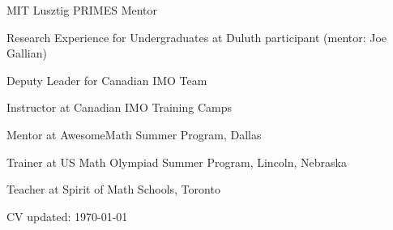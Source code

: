 \documentclass[11pt]{amsart}
\begin{document}

MIT Lusztig PRIMES Mentor

Research Experience for Undergraduates at Duluth participant (mentor: Joe Gallian) %

Deputy Leader for Canadian IMO Team %

Instructor at Canadian IMO Training Camps %

Mentor at AwesomeMath Summer Program, Dallas %

Trainer at US Math Olympiad Summer Program, Lincoln, Nebraska %

Teacher at Spirit of Math Schools, Toronto %

\vspace{\fill}

{\hfill \footnotesize CV updated: \today}
\end{document}
